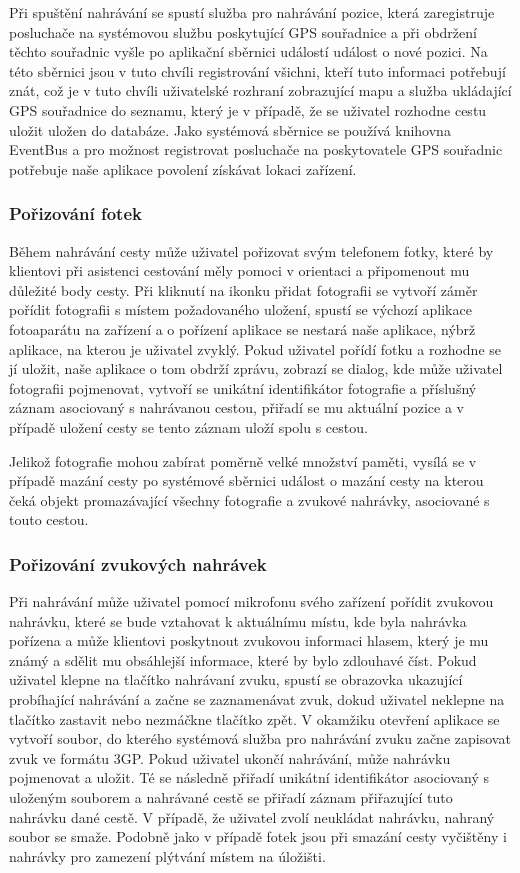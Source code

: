 \documentclass[czech,master,public,dept460,male,java,cpdeclaration]{diploma}
\begin{document}
Při spuštění nahrávání se spustí služba pro nahrávání pozice, která zaregistruje
posluchače na systémovou službu poskytující GPS souřadnice a při obdržení těchto souřadnic
vyšle po aplikační sběrnici událostí událost o nové pozici. Na této sběrnici jsou v tuto chvíli
registrování všichni, kteří tuto informaci potřebují znát, což je v tuto chvíli uživatelské rozhraní
zobrazující mapu a služba ukládající GPS souřadnice do seznamu, který je v případě, že se uživatel
rozhodne cestu uložit uložen do databáze. Jako systémová sběrnice se používá knihovna EventBus a pro
možnost registrovat posluchače na poskytovatele GPS souřadnic potřebuje naše aplikace povolení
získávat lokaci zařízení.

\subsubsection{Pořizování fotek}
Během nahrávání cesty může uživatel pořizovat svým telefonem fotky, které by klientovi při asistenci
cestování měly pomoci v orientaci a připomenout mu důležité body cesty. Při kliknutí na ikonku přidat
fotografii se vytvoří záměr pořídit fotografii s místem požadovaného uložení, spustí se
výchozí aplikace fotoaparátu na zařízení a o pořízení aplikace se nestará naše
aplikace, nýbrž aplikace, na kterou je uživatel zvyklý. Pokud uživatel pořídí fotku a rozhodne se jí
uložit, naše aplikace o tom obdrží zprávu, zobrazí se dialog, kde může uživatel fotografii pojmenovat,
vytvoří se unikátní identifikátor fotografie a příslušný záznam asociovaný s nahrávanou cestou,
přiřadí se mu aktuální pozice a v případě uložení cesty se tento záznam uloží spolu s cestou.

Jelikož fotografie mohou zabírat poměrně velké množství paměti, vysílá se v případě mazání cesty po
systémové sběrnici událost o mazání cesty na kterou čeká objekt promazávající všechny fotografie
a zvukové nahrávky, asociované s touto cestou.

\subsubsection{Pořizování zvukových nahrávek}
Při nahrávání může uživatel pomocí mikrofonu svého zařízení pořídit zvukovou nahrávku, které se bude
vztahovat k aktuálnímu místu, kde byla nahrávka pořízena a může klientovi poskytnout zvukovou
informaci hlasem, který je mu známý a sdělit mu obsáhlejší informace, které by bylo zdlouhavé číst.
Pokud uživatel klepne na tlačítko nahrávaní zvuku, spustí se obrazovka ukazující probíhající nahrávání
a začne se zaznamenávat zvuk, dokud uživatel neklepne na tlačítko zastavit nebo nezmáčkne tlačítko zpět.
V okamžiku otevření aplikace se vytvoří soubor, do kterého systémová služba pro nahrávání
zvuku začne zapisovat zvuk ve formátu 3GP.
Pokud uživatel ukončí nahrávání, může nahrávku pojmenovat a uložit. Té se následně přiřadí unikátní
identifikátor asociovaný s uloženým souborem a nahrávané cestě se přiřadí záznam přiřazující tuto
nahrávku dané cestě. V případě, že uživatel zvolí neukládat nahrávku, nahraný soubor se smaže.
Podobně jako v případě fotek jsou při smazání cesty vyčištěny i nahrávky pro zamezení plýtvání místem
na úložišti.
\end{document}
